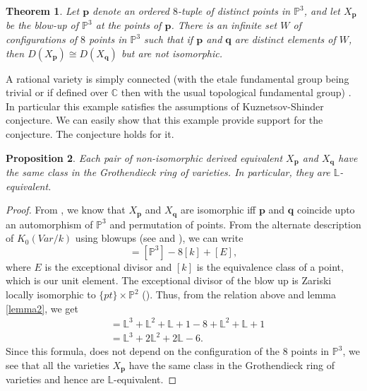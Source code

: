 \documentclass[a4, 11pt]{amsart}
\newtheorem{theorem}{Theorem}[section]
\newtheorem{proposition}[theorem]{\sf Proposition}
\def\C{\mathbb C}
\def \P{\mathbb P}
\def \L{\mathbb L}
\begin{document}
\begin{theorem}\cite{Lesi} Let $\textbf{p}$ denote an ordered $8$-tuple of distinct points in $\P^3$, and let $X_{\textbf{p}}$ be the blow-up of $\P^3$ at the points of $\textbf{p}$. There is an infinite set $W$ of configurations of $8$ points in $\P^3$ such that if $\textbf{p}$ and $\textbf{q}$ are distinct elements of $W$, then $D(X_{\textbf{p}}) \cong D(X_{\textbf{q}})$ but  are not isomorphic. 
\end{theorem}

A rational variety is simply connected (with the etale fundamental group being trivial or if defined over $\C$ then with the usual topological fundamental group) \cite[Corollary 4.18]{debarre}. In particular this example satisfies the assumptions of Kuznetsov-Shinder conjecture. We can easily show that this example provide support for the conjecture. The conjecture holds for it. 

\begin{proposition}
    Each pair of non-isomorphic derived equivalent $X_{\textbf{p}}$ and $X_{\textbf{q}}$ have the same class in the Grothendieck ring of varieties. In particular, they are $\L$-equivalent.  
\end{proposition}

\begin{proof}
    From \cite[Lemma 1]{Lesi}, we know that $X_{\textbf{p}}$ and $X_{\textbf{q}}$ are isomorphic iff $\textbf{p}$ and $\textbf{q}$ coincide upto an automorphism of $\P^3$ and permutation of points. From the alternate description of $K_0(Var/k)$ using blowups (see \cite{Bittner} and \cite{Looi}), we can write 
    \begin{equation}
        [X_{\textbf{p}}] = [\P^3] -8[k] + [E],
    \end{equation}
    where $E$ is the exceptional divisor and $[k]$ is the equivalence class of a point, which is our unit element. The exceptional divisor of the blow up is Zariski locally isomorphic to $\{pt\} \times \P^2$ (\cite[Theorem II 8.24]{Hartshorne}). Thus, from the relation above and lemma \ref{lemma2}, we get
    \begin{eqnarray*}
        [X_{\textbf{p}}]  &= \L^3 + \L^2 + \L + 1 -8 + \L^2+ \L + 1 \\
                        & = \L^3 + 2\L^2 + 2\L - 6.
    \end{eqnarray*}
    Since this formula, does not depend on the configuration of the 8 points in $\P^3$, we see that all the varieties $X_{\textbf{p}}$ have the same class in the Grothendieck ring of varieties and hence are $\L$-equivalent. 
\end{proof}
\end{document}
